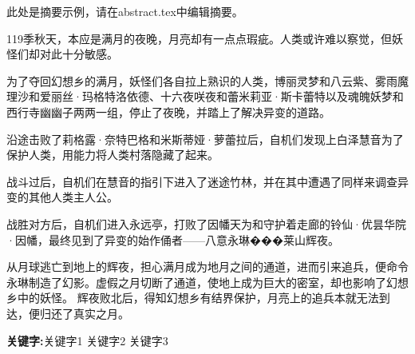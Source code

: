 \begin{cnabstract}

    此处是摘要示例，请在abstract.tex中编辑摘要。

    119季秋天，本应是满月的夜晚，月亮却有一点点瑕疵。人类或许难以察觉，但妖怪们却对此十分敏感。

    为了夺回幻想乡的满月，妖怪们各自拉上熟识的人类，博丽灵梦和八云紫、雾雨魔理沙和爱丽丝·玛格特洛依德、十六夜咲夜和蕾米莉亚·斯卡蕾特以及魂魄妖梦和西行寺幽幽子两两一组，停止了夜晚，并踏上了解决异变的道路。

    沿途击败了莉格露·奈特巴格和米斯蒂娅·萝蕾拉后，自机们发现上白泽慧音为了保护人类，用能力将人类村落隐藏了起来。

    战斗过后，自机们在慧音的指引下进入了迷途竹林，并在其中遭遇了同样来调查异变的其他人类主人公。

    战胜对方后，自机们进入永远亭，打败了因幡天为和守护着走廊的铃仙·优昙华院·因幡，最终见到了异变的始作俑者——八意永琳���莱山辉夜。

    从月球逃亡到地上的辉夜，担心满月成为地月之间的通道，进而引来追兵，便命令永琳制造了幻影。虚假之月切断了通道，使地上成为巨大的密室，却也影响了幻想乡中的妖怪。
    辉夜败北后，得知幻想乡有结界保护，月亮上的追兵本就无法到达，便归还了真实之月。
    \par\textbf{关键字:}关键字1 \hspace{2em} 关键字2 \hspace{2em} 关键字3
\end{cnabstract}
